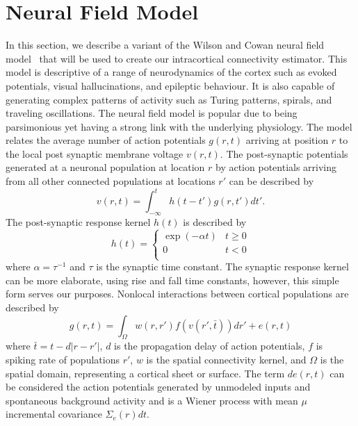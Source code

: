 \documentclass[onecolumn,draftcls]{IEEEtran}
\begin{document}
\section{Neural Field Model}
In this section, we describe a variant of the  Wilson and Cowan neural field model~\cite{Wilson1973} that will be used to create our intracortical connectivity estimator. This model is descriptive of a range of neurodynamics of the cortex such as evoked potentials, visual hallucinations, and epileptic behaviour. It is also capable of generating complex patterns of activity such as Turing patterns, spirals, and traveling oscillations. The neural field model is popular due to being parsimonious yet having a strong link with the underlying physiology.
The model relates the average number of action potentials $g(r,t)$ arriving at position $r$ to the local post synaptic membrane voltage $v(r,t)$. The post-synaptic potentials generated at a neuronal population at location $r$ by action potentials arriving from all other connected populations at locations $r'$ can be described by
\begin{equation}\label{SpikesToPotential}
v\left( {r,t} \right) = \int_{ - \infty }^t {h\left( {t - t'} \right)g\left( {r,t'} \right)dt'}.
\end{equation}
The post-synaptic response kernel $h(t)$ is described by
\begin{equation}\label{SynapticRespKernel}
h(t) = \left\{ {\begin{array}{*{20}{c}}
   {\exp ( - \alpha t)} & {t \ge 0}  \\
   0 & {t < 0}  \\
\end{array}} \right.
\end{equation}
where $\alpha=\tau^{-1}$ and $\tau$ is the synaptic time constant. The synaptic response kernel can be more elaborate, using rise and fall time constants, however, this simple form serves our purposes. Nonlocal interactions between cortical populations are described by	
\begin{equation}\label{RateBasedInteractions}
g\left( r,t \right) = \int_\Omega  {w\left( r,r' \right)f\left( v\left( r',\bar t \right) \right)dr'} + e\left(r,t\right)
\end{equation}
where $\bar t = t - d\left| {r - r'} \right|$, $d$ is the propagation delay of action potentials, $f$ is spiking rate of populations $r'$, $w$ is the spatial connectivity kernel, and $\Omega$ is the spatial domain, representing a cortical sheet or surface. The term $de(r,t)$ can be considered the action potentials generated by unmodeled inputs and spontaneous background activity and is a Wiener process with mean $\mu$ incremental covariance $\Sigma_e(r)dt$. 
\end{document}
